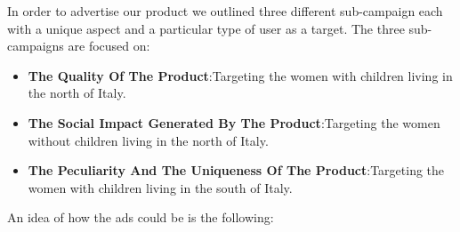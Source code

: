 In order to advertise our product we outlined three different sub-campaign each with a unique aspect and a particular type of user as a target. The three sub-campaigns are focused on:
\begin{itemize}
	\item \textbf{The Quality Of The Product}:\@ \newline Targeting the women with children living in the north of Italy.
	\item \textbf{The Social Impact Generated By The Product}:\@ \newline Targeting the women without children living in the north of Italy.
	\item \textbf{The Peculiarity And The Uniqueness Of The Product}:\@ \newline Targeting the women with children living in the south of Italy.
\end{itemize} 
An idea of how the ads could be is the following: \newline\\\\
